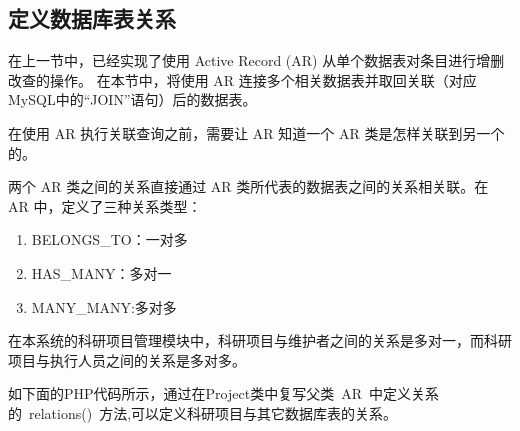 \subsection{定义数据库表关系}
在上一节中，已经实现了使用 Active Record (AR) 从单个数据表对条目进行增删改查的操作。 在本节中，将使用 AR 连接多个相关数据表并取回关联（对应MySQL中的“JOIN”语句）后的数据表。

在使用 AR 执行关联查询之前，需要让 AR 知道一个 AR 类是怎样关联到另一个的。

两个 AR 类之间的关系直接通过 AR 类所代表的数据表之间的关系相关联。在 AR 中，定义了三种关系类型：
\begin{enumerate}
\item BELONGS\_TO：一对多
\item HAS\_MANY：多对一
\item MANY\_MANY:多对多
\end{enumerate}

在本系统的科研项目管理模块中，科研项目与维护者之间的关系是多对一，而科研项目与执行人员之间的关系是多对多。

如下面的PHP代码所示，通过在Project类中复写父类~AR~中定义关系的~relations()~方法,可以定义科研项目与其它数据库表的关系。



